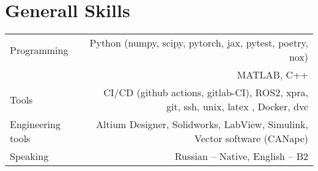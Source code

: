 \section*{Generall Skills}
\begin{tabular}{@{}L!{\VRule}R}
    Programming    & Python (numpy, scipy, pytorch, jax, pytest, poetry, nox) \\
    & MATLAB, C++                    \\
    Tools &  CI/CD (github actions, gitlab-CI), ROS2, xpra, git, ssh, unix, latex , Docker, dvc \\
    Engineering tools &  Altium Designer, Solidworks, LabView, Simulink, Vector software (CANape) \\
    Speaking      & Russian -- Native, English -- B2                      \\
\end{tabular}